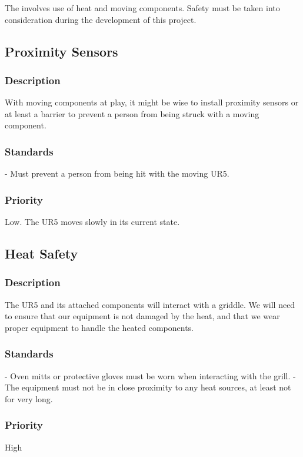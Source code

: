 The \productname{} involves use of heat and moving components. Safety must be taken into consideration during the development of this project.

\subsection{Proximity Sensors}
\subsubsection{Description}
With moving components at play, it might be wise to install proximity sensors or at least a barrier to prevent a person from being struck with a moving component.
\subsubsection{Standards}
- Must prevent a person from being hit with the moving UR5.
\subsubsection{Priority}
Low. The UR5 moves slowly in its current state.



\subsection{Heat Safety}
\subsubsection{Description}
The UR5 and its attached components will interact with a griddle. We will need to ensure that our equipment is not damaged by the heat, and that we wear proper equipment to handle the heated components.
\subsubsection{Standards}
- Oven mitts or protective gloves must be worn when interacting with the grill.
- The equipment must not be in close proximity to any heat sources, at least not for very long. 
\subsubsection{Priority}
High